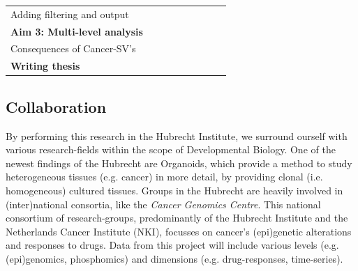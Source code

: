\documentclass[twoside,fontsize=10pt]{article}
\begin{document}
\begin{table}[h]
\begin{center}
\begin{tabular}{lllllllll}
\hspace*{1em} Adding filtering and output       &                                                 &                                                 &                                                 & \cellcolor[HTML]{656565}                        &                                                \cellcolor[HTML]{656565}   &                                                 &                                                 &                                                 \\
\textbf{Aim 3: Multi-level analysis}            &                                                 &                                                 &                                                 &                                                 &  & \cellcolor[HTML]{343434}{\color[HTML]{343434} } & \cellcolor[HTML]{343434}{\color[HTML]{343434} } & \cellcolor[HTML]{343434}{\color[HTML]{343434} } \\
\hspace*{1em} Consequences of Cancer-SV's       &                                                 &                                                 &                                                 &                                                 &                        & \cellcolor[HTML]{656565}                        & \cellcolor[HTML]{656565}                        & \cellcolor[HTML]{656565}                        \\
\textbf{Writing thesis}                         &                                                 &                                                 &                                                 &                                                 &                                                 &                                                 &                                                 & \cellcolor[HTML]{343434}                       
\end{tabular}
\end{center}
\end{table}


\subsection*{Collaboration}
By performing this research in the Hubrecht Institute, we surround ourself with various research-fields within the scope of Developmental Biology. One of the newest findings of the Hubrecht are Organoids, which provide a method to study heterogeneous tissues (e.g. cancer) in more detail, by providing clonal (i.e. homogeneous) cultured tissues. Groups in the Hubrecht are heavily involved in (inter)national consortia, like the \textit{Cancer Genomics Centre}. This national consortium of research-groups, predominantly of the Hubrecht Institute and the Netherlands Cancer Institute (NKI), focusses on cancer's (epi)genetic alterations and responses to drugs. Data from this project will include various levels (e.g. (epi)genomics, phosphomics) and dimensions (e.g. drug-responses, time-series). 
\end{document}
